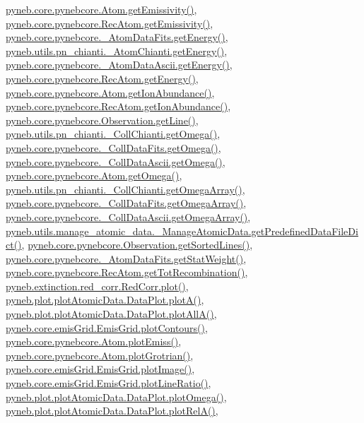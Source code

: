 \hyperlink{pynebcore_8py_source_l01782}{pyneb.\-core.\-pynebcore.\-Atom.\-get\-Emissivity()}, \hyperlink{pynebcore_8py_source_l02990}{pyneb.\-core.\-pynebcore.\-Rec\-Atom.\-get\-Emissivity()}, \hyperlink{pynebcore_8py_source_l00275}{pyneb.\-core.\-pynebcore.\-\_\-\-Atom\-Data\-Fits.\-get\-Energy()}, \hyperlink{pn__chianti_8py_source_l00366}{pyneb.\-utils.\-pn\-\_\-chianti.\-\_\-\-Atom\-Chianti.\-get\-Energy()}, \hyperlink{pynebcore_8py_source_l00537}{pyneb.\-core.\-pynebcore.\-\_\-\-Atom\-Data\-Ascii.\-get\-Energy()}, \hyperlink{pynebcore_8py_source_l02927}{pyneb.\-core.\-pynebcore.\-Rec\-Atom.\-get\-Energy()}, \hyperlink{pynebcore_8py_source_l02176}{pyneb.\-core.\-pynebcore.\-Atom.\-get\-Ion\-Abundance()}, \hyperlink{pynebcore_8py_source_l03083}{pyneb.\-core.\-pynebcore.\-Rec\-Atom.\-get\-Ion\-Abundance()}, \hyperlink{pynebcore_8py_source_l03665}{pyneb.\-core.\-pynebcore.\-Observation.\-get\-Line()}, \hyperlink{pn__chianti_8py_source_l00507}{pyneb.\-utils.\-pn\-\_\-chianti.\-\_\-\-Coll\-Chianti.\-get\-Omega()}, \hyperlink{pynebcore_8py_source_l00828}{pyneb.\-core.\-pynebcore.\-\_\-\-Coll\-Data\-Fits.\-get\-Omega()}, \hyperlink{pynebcore_8py_source_l01082}{pyneb.\-core.\-pynebcore.\-\_\-\-Coll\-Data\-Ascii.\-get\-Omega()}, \hyperlink{pynebcore_8py_source_l01324}{pyneb.\-core.\-pynebcore.\-Atom.\-get\-Omega()}, \hyperlink{pn__chianti_8py_source_l00484}{pyneb.\-utils.\-pn\-\_\-chianti.\-\_\-\-Coll\-Chianti.\-get\-Omega\-Array()}, \hyperlink{pynebcore_8py_source_l00800}{pyneb.\-core.\-pynebcore.\-\_\-\-Coll\-Data\-Fits.\-get\-Omega\-Array()}, \hyperlink{pynebcore_8py_source_l01058}{pyneb.\-core.\-pynebcore.\-\_\-\-Coll\-Data\-Ascii.\-get\-Omega\-Array()}, \hyperlink{manage__atomic__data_8py_source_l00034}{pyneb.\-utils.\-manage\-\_\-atomic\-\_\-data.\-\_\-\-Manage\-Atomic\-Data.\-get\-Predefined\-Data\-File\-Dict()}, \hyperlink{pynebcore_8py_source_l03684}{pyneb.\-core.\-pynebcore.\-Observation.\-get\-Sorted\-Lines()}, \hyperlink{pynebcore_8py_source_l00249}{pyneb.\-core.\-pynebcore.\-\_\-\-Atom\-Data\-Fits.\-get\-Stat\-Weight()}, \hyperlink{pynebcore_8py_source_l02851}{pyneb.\-core.\-pynebcore.\-Rec\-Atom.\-get\-Tot\-Recombination()}, \hyperlink{red__corr_8py_source_l00303}{pyneb.\-extinction.\-red\-\_\-corr.\-Red\-Corr.\-plot()}, \hyperlink{plot_atomic_data_8py_source_l00117}{pyneb.\-plot.\-plot\-Atomic\-Data.\-Data\-Plot.\-plot\-A()}, \hyperlink{plot_atomic_data_8py_source_l00189}{pyneb.\-plot.\-plot\-Atomic\-Data.\-Data\-Plot.\-plot\-All\-A()}, \hyperlink{emis_grid_8py_source_l00182}{pyneb.\-core.\-emis\-Grid.\-Emis\-Grid.\-plot\-Contours()}, \hyperlink{pynebcore_8py_source_l02384}{pyneb.\-core.\-pynebcore.\-Atom.\-plot\-Emiss()}, \hyperlink{pynebcore_8py_source_l02443}{pyneb.\-core.\-pynebcore.\-Atom.\-plot\-Grotrian()}, \hyperlink{emis_grid_8py_source_l00140}{pyneb.\-core.\-emis\-Grid.\-Emis\-Grid.\-plot\-Image()}, \hyperlink{emis_grid_8py_source_l00241}{pyneb.\-core.\-emis\-Grid.\-Emis\-Grid.\-plot\-Line\-Ratio()}, \hyperlink{plot_atomic_data_8py_source_l00373}{pyneb.\-plot.\-plot\-Atomic\-Data.\-Data\-Plot.\-plot\-Omega()}, \hyperlink{plot_atomic_data_8py_source_l00262}{pyneb.\-plot.\-plot\-Atomic\-Data.\-Data\-Plot.\-plot\-Rel\-A()}, 
